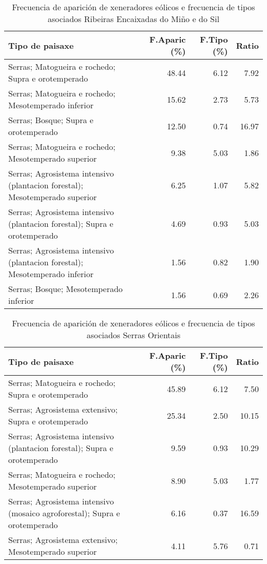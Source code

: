\begin{table}[p]
\centering
\caption{Frecuencia de aparición de xeneradores eólicos e frecuencia de tipos asociados Ribeiras Encaixadas do Miño e do Sil} 
\label{veolico4}
\begin{tabular}{lrrr}
  \hline
Tipo de paisaxe & F.Aparic (\%) & F.Tipo (\%) & Ratio \\ 
  \hline
Serras; Matogueira e rochedo; Supra e orotemperado & 48.44 & 6.12 & 7.92 \\ 
  Serras; Matogueira e rochedo; Mesotemperado inferior & 15.62 & 2.73 & 5.73 \\ 
  Serras; Bosque; Supra e orotemperado & 12.50 & 0.74 & 16.97 \\ 
  Serras; Matogueira e rochedo; Mesotemperado superior & 9.38 & 5.03 & 1.86 \\ 
  Serras; Agrosistema intensivo (plantacion forestal); Mesotemperado superior & 6.25 & 1.07 & 5.82 \\ 
  Serras; Agrosistema intensivo (plantacion forestal); Supra e orotemperado & 4.69 & 0.93 & 5.03 \\ 
  Serras; Agrosistema intensivo (plantacion forestal); Mesotemperado inferior & 1.56 & 0.82 & 1.90 \\ 
  Serras; Bosque; Mesotemperado inferior & 1.56 & 0.69 & 2.26 \\ 
   \hline
\end{tabular}
\end{table}
\begin{table}[p]
\centering
\caption{Frecuencia de aparición de xeneradores eólicos e frecuencia de tipos asociados Serras Orientais} 
\label{veolico5}
\begin{tabular}{lrrr}
  \hline
Tipo de paisaxe & F.Aparic (\%) & F.Tipo (\%) & Ratio \\ 
  \hline
Serras; Matogueira e rochedo; Supra e orotemperado & 45.89 & 6.12 & 7.50 \\ 
  Serras; Agrosistema extensivo; Supra e orotemperado & 25.34 & 2.50 & 10.15 \\ 
  Serras; Agrosistema intensivo (plantacion forestal); Supra e orotemperado & 9.59 & 0.93 & 10.29 \\ 
  Serras; Matogueira e rochedo; Mesotemperado superior & 8.90 & 5.03 & 1.77 \\ 
  Serras; Agrosistema intensivo (mosaico agroforestal); Supra e orotemperado & 6.16 & 0.37 & 16.59 \\ 
  Serras; Agrosistema extensivo; Mesotemperado superior & 4.11 & 5.76 & 0.71 \\ 
   \hline
\end{tabular}
\end{table}
